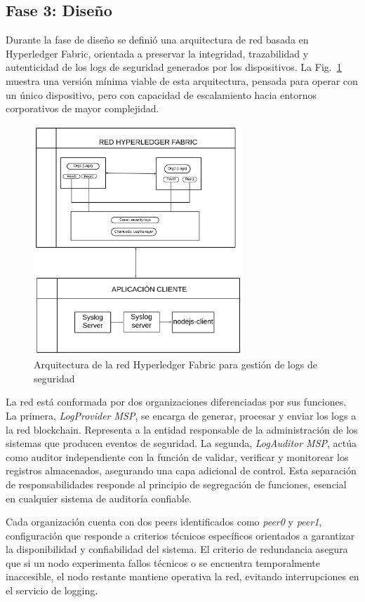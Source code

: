 \subsection{Fase 3: Diseño}
Durante la fase de diseño se definió una arquitectura de red basada en Hyperledger Fabric, orientada a preservar la integridad, trazabilidad y autenticidad de los logs de seguridad generados por los dispositivos. La Fig.~\ref{figura:diseno-red} muestra una versión mínima viable de esta arquitectura, pensada para operar con un único dispositivo, pero con capacidad de escalamiento hacia entornos corporativos de mayor complejidad.
\begin{figure}[H]
\centering
\includegraphics[width=0.70\textwidth]{figuras/Diseno_red_blockchian.png}
\caption{Arquitectura de la red Hyperledger Fabric para gestión de logs de seguridad}
\label{figura:diseno-red}
\end{figure}
La red está conformada por dos organizaciones diferenciadas por sus funciones. La primera, \textit{LogProvider MSP}, se encarga de generar, procesar y enviar los logs a la red blockchain. Representa a la entidad responsable de la administración de los sistemas que producen eventos de seguridad. La segunda, \textit{LogAuditor MSP}, actúa como auditor independiente con la función de validar, verificar y monitorear los registros almacenados, asegurando una capa adicional de control. Esta separación de responsabilidades responde al principio de segregación de funciones, esencial en cualquier sistema de auditoría confiable.


Cada organización cuenta con dos peers identificados como \textit{peer0} y \textit{peer1}, configuración que responde a criterios técnicos específicos orientados a garantizar la disponibilidad y confiabilidad del sistema. El criterio de redundancia asegura que si un nodo experimenta fallos técnicos o se encuentra temporalmente inaccesible, el nodo restante mantiene operativa la red, evitando interrupciones en el servicio de logging.

